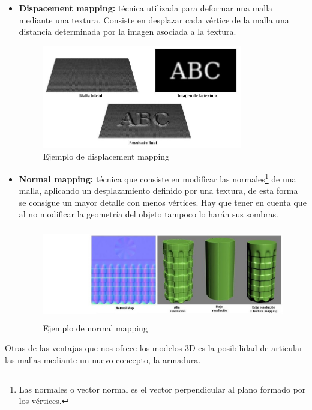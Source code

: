 \begin{description}
\begin{itemize}
\begin{itemize}
\item \textbf{Dispacement mapping:} técnica utilizada para deformar una malla mediante una textura. Consiste en desplazar cada vértice de la malla una distancia determinada por la imagen asociada a la textura. 

\begin{figure}[h]
\centering	  
\includegraphics[height=4.5cm]{img/Displacement.jpg}
\caption{Ejemplo de displacement mapping}
\end{figure}

\item \textbf{Normal mapping:} técnica que consiste en modificar las normales\footnote{Las normales o vector normal es el vector perpendicular al plano formado por los vértices.} de una malla, aplicando un desplazamiento definido por una textura, de esta forma se consigue un mayor detalle con menos vértices. Hay que tener en cuenta que al no modificar la geometría del objeto tampoco lo harán sus sombras.\begin{figure}[ht]
\centering	  
\includegraphics[height=4cm]{img/NormalMapping.jpg}
\caption{Ejemplo de normal mapping}
\end{figure}
 

\end{itemize}
\end{itemize}

\end{description}

Otras de las ventajas que nos ofrece los modelos 3D es la posibilidad de articular las mallas mediante un nuevo concepto, la armadura. 
\newline

